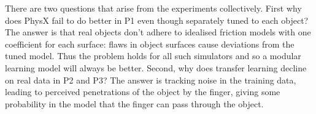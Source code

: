 There are two questions that arise from the experiments collectively. First why does PhysX fail to do better in P1 even though separately tuned to each object? The answer is that real objects don't adhere to idealised friction models with one coefficient for each surface: flaws in object surfaces cause deviations from the tuned model. Thus the problem holds for all such simulators and so a modular learning model will always be better. Second, why does transfer learning decline on real data in P2 and P3? The answer is tracking noise in the training data, leading to perceived penetrations of the object by the finger, giving some probability in the model that the finger can pass through the object. 















